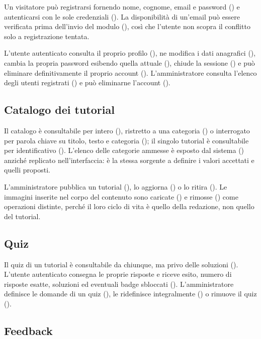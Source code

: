 Un visitatore può registrarsi fornendo nome, cognome, email e password
() e autenticarsi con le sole credenziali (). La
disponibilità di un'email può essere verificata prima dell'invio del modulo
(), così che l'utente non scopra il conflitto solo a
registrazione tentata.

L'utente autenticato consulta il proprio profilo (), ne
modifica i dati anagrafici (), cambia la propria password
esibendo quella attuale (), chiude la sessione
() e può eliminare definitivamente il proprio account
(). L'amministratore consulta l'elenco degli utenti registrati
() e può eliminarne l'account ().

\subsection{Catalogo dei tutorial}

Il catalogo è consultabile per intero (), ristretto a una
categoria () o interrogato per parola chiave su titolo, testo e
categoria (); il singolo tutorial è consultabile per
identificativo (). L'elenco delle categorie ammesse è esposto
dal sistema () anziché replicato nell'interfaccia: è la stessa
sorgente a definire i valori accettati e quelli proposti.

L'amministratore pubblica un tutorial (), lo aggiorna
() o lo ritira (). Le immagini inserite nel corpo
del contenuto sono caricate () e rimosse () come
operazioni distinte, perché il loro ciclo di vita è quello della redazione,
non quello del tutorial.

\subsection{Quiz}

Il quiz di un tutorial è consultabile da chiunque, ma privo delle soluzioni
(). L'utente autenticato consegna le proprie risposte e riceve
esito, numero di risposte esatte, soluzioni ed eventuali badge sbloccati
(). L'amministratore definisce le domande di un quiz
(), le ridefinisce integralmente () o rimuove il
quiz ().

\subsection{Feedback}

